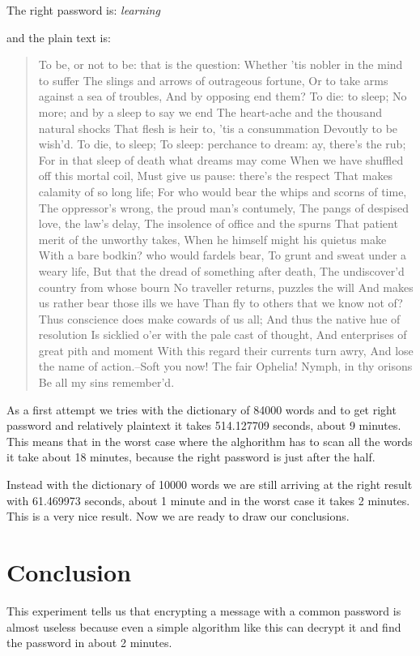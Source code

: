 \documentclass[11pt]{article}
\begin{document}
The right password is: {\em learning}

and the plain text is:
\begin{quote}
To be, or not to be: that is the question:
Whether 'tis nobler in the mind to suffer
The slings and arrows of outrageous fortune,
Or to take arms against a sea of troubles,
And by opposing end them? To die: to sleep;
No more; and by a sleep to say we end
The heart-ache and the thousand natural shocks
That flesh is heir to, 'tis a consummation
Devoutly to be wish'd. To die, to sleep;
To sleep: perchance to dream: ay, there's the rub;
For in that sleep of death what dreams may come
When we have shuffled off this mortal coil,
Must give us pause: there's the respect
That makes calamity of so long life;
For who would bear the whips and scorns of time,
The oppressor's wrong, the proud man's contumely,
The pangs of despised love, the law's delay,
The insolence of office and the spurns
That patient merit of the unworthy takes,
When he himself might his quietus make
With a bare bodkin? who would fardels bear,
To grunt and sweat under a weary life,
But that the dread of something after death,
The undiscover'd country from whose bourn
No traveller returns, puzzles the will
And makes us rather bear those ills we have
Than fly to others that we know not of?
Thus conscience does make cowards of us all;
And thus the native hue of resolution
Is sicklied o'er with the pale cast of thought,
And enterprises of great pith and moment
With this regard their currents turn awry,
And lose the name of action.--Soft you now!
The fair Ophelia! Nymph, in thy orisons
Be all my sins remember'd.
\end{quote}

As a first attempt we tries with the dictionary of 84000 words and to get right password and relatively plaintext it takes 514.127709 seconds, about 9 minutes. This means that in the worst case where the alghorithm has to scan all the words it take about 18 minutes, because the right password is just after the half.

Instead with the dictionary of 10000 words we are still arriving at the right result with 61.469973 seconds, about 1 minute and in the worst case it takes 2 minutes. This is a very nice result. Now we are ready to draw our conclusions.

\section{Conclusion}
This experiment tells us that encrypting a message with a common password is almost useless because even a simple algorithm like this can decrypt it and find the password in about 2 minutes.
\end{document}
